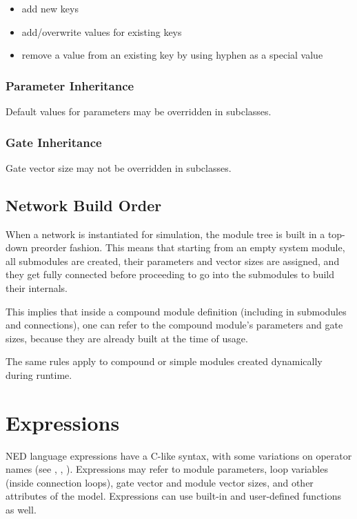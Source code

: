 {\begin{itemize}
    \item add new keys
    \item add/overwrite values for existing keys
    \item remove a value from an existing key by using hyphen as a special value
\end{itemize}


\subsubsection{Parameter Inheritance}
\label{sec:ned-ref:parameter-inheritance}

Default values for parameters may be overridden in subclasses.

\subsubsection{Gate Inheritance}
\label{sec:ned-ref:gate-inheritance}

Gate vector size may not be overridden in subclasses.


\subsection{Network Build Order}
\label{sec:ned-ref:build-order}

When a network is instantiated for simulation, the module tree is built in
a top-down preorder fashion. This means that starting from an empty system
module, all submodules are created, their parameters and vector sizes are
assigned, and they get fully connected before proceeding to go into the
submodules to build their internals.

This implies that inside a compound module definition (including in
submodules and connections), one can refer to the compound module's
parameters and gate sizes, because they are already built at the time of
usage.

The same rules apply to compound or simple modules created dynamically during
runtime.


\section{Expressions}
\label{sec:ned-ref:expressions}

NED language expressions have a C-like syntax, with
some variations on operator names (see \ttt{\textasciicircum}, \ttt{\#}, \ttt{\#\#}).
Expressions may refer to module parameters, loop variables (inside connection
 loops), gate vector and module vector sizes, and other attributes
of the model. Expressions can use built-in and user-defined functions as well.

}
